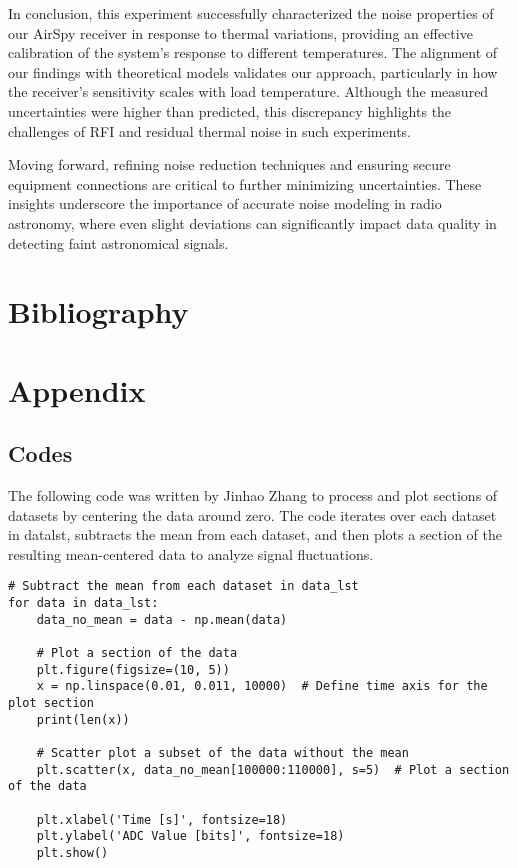 \documentclass[10pt, preprint]{aastex}
\begin{document}
In conclusion, this experiment successfully characterized the noise properties of our AirSpy receiver in response to thermal variations, providing an effective calibration of the system's response to different temperatures. The alignment of our findings with theoretical models validates our approach, particularly in how the receiver’s sensitivity scales with load temperature. Although the measured uncertainties were higher than predicted, this discrepancy highlights the challenges of RFI and residual thermal noise in such experiments.

Moving forward, refining noise reduction techniques and ensuring secure equipment connections are critical to further minimizing uncertainties. These insights underscore the importance of accurate noise modeling in radio astronomy, where even slight deviations can significantly impact data quality in detecting faint astronomical signals.  

\section{Bibliography}



\section*{Appendix} \label{Appendix}

\subsection{Codes}

The following code was written by Jinhao Zhang to process and plot sections of datasets by centering the data around zero. The code iterates over each dataset in datalst, subtracts the mean from each dataset, and then plots a section of the resulting mean-centered data to analyze signal fluctuations.

\begin{verbatim}
# Subtract the mean from each dataset in data_lst
for data in data_lst:
    data_no_mean = data - np.mean(data)

    # Plot a section of the data
    plt.figure(figsize=(10, 5))
    x = np.linspace(0.01, 0.011, 10000)  # Define time axis for the plot section
    print(len(x))
    
    # Scatter plot a subset of the data without the mean
    plt.scatter(x, data_no_mean[100000:110000], s=5)  # Plot a section of the data
    
    plt.xlabel('Time [s]', fontsize=18)
    plt.ylabel('ADC Value [bits]', fontsize=18)
    plt.show()
\end{verbatim}
\end{document}
